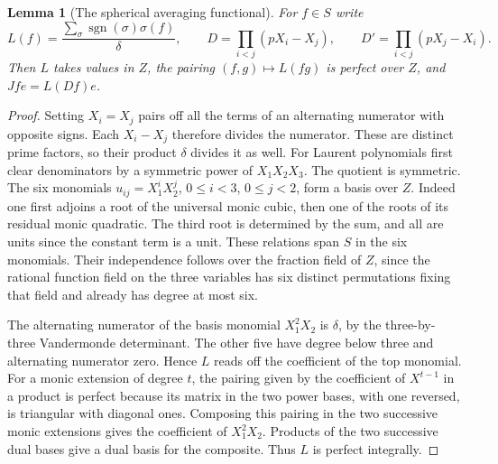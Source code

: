 \documentclass[a4paper,11pt]{article}
\newtheorem{lemma}[proposition]{Lemma}
\theoremstyle{definition}
\theoremstyle{remark}
\numberwithin{equation}{section}
\begin{document}
\begin{lemma}[The spherical averaging functional]
\label{lem:symmetrizer370}
For \(f\in S\) write
\[
 L(f)=\frac{\sum_{\sigma}\operatorname{sgn}(\sigma)\sigma(f)}{\delta},
 \qquad D=\prod_{i<j}(pX_i-X_j),\qquad
 D'=\prod_{i<j}(pX_j-X_i).
\]
Then \(L\) takes values in \(Z\), the pairing
\((f,g)\mapsto L(fg)\) is perfect over \(Z\), and
\(J f e=L(D f)e\).
\end{lemma}
\begin{proof}
Setting \(X_i=X_j\) pairs off all the terms of an alternating
numerator with opposite signs. Each \(X_i-X_j\) therefore
divides the numerator. These are distinct prime factors, so
their product \(\delta\) divides it as well.
For Laurent polynomials first clear denominators by a
symmetric power of \(X_1X_2X_3\). The quotient is symmetric.
The six monomials \(u_{ij}=X_1^iX_2^j\), \(0\le i<3\),
\(0\le j<2\), form a basis over \(Z\). Indeed one first
adjoins a root of the universal monic cubic, then one of
the roots of its residual monic quadratic. The third root
is determined by the sum, and all are units since the
constant term is a unit. These relations span \(S\) in
the six monomials. Their independence follows over the
fraction field of \(Z\), since the rational function field
on the three variables has six distinct permutations fixing
that field and already has degree at most six.

The alternating numerator of the basis monomial \(X_1^2X_2\)
is \(\delta\), by the three-by-three Vandermonde determinant.
The other five have degree below three and alternating
numerator zero. Hence \(L\) reads off the coefficient of
the top monomial. For a monic extension of degree \(t\),
the pairing given by the coefficient of \(X^{t-1}\) in a
product is perfect because its matrix in the two power bases,
with one reversed, is triangular with diagonal ones. Composing this
pairing in the two successive monic extensions gives the
coefficient of \(X_1^2X_2\). Products of the two successive
dual bases give a dual basis for the composite. Thus \(L\)
is perfect integrally.


\end{proof}
\end{document}
